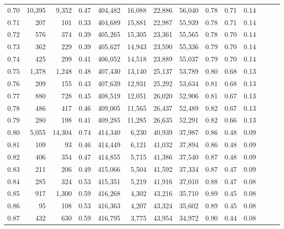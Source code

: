 \begin{tabular}{rrrrrrrrrrrrrr}
0.70 &  10,395 &   9,352 &  0.47 &  404,482 &   16,088 &  22,886 &  56,040 &  0.78 &  0.71 &      0.14 \\
0.71 &     207 &     101 &  0.33 &  404,689 &   15,881 &  22,987 &  55,939 &  0.78 &  0.71 &      0.14 \\
0.72 &     576 &     374 &  0.39 &  405,265 &   15,305 &  23,361 &  55,565 &  0.78 &  0.70 &      0.14 \\
0.73 &     362 &     229 &  0.39 &  405,627 &   14,943 &  23,590 &  55,336 &  0.79 &  0.70 &      0.14 \\
0.74 &     425 &     299 &  0.41 &  406,052 &   14,518 &  23,889 &  55,037 &  0.79 &  0.70 &      0.14 \\
0.75 &   1,378 &   1,248 &  0.48 &  407,430 &   13,140 &  25,137 &  53,789 &  0.80 &  0.68 &      0.13 \\
0.76 &     209 &     155 &  0.43 &  407,639 &   12,931 &  25,292 &  53,634 &  0.81 &  0.68 &      0.13 \\
0.77 &     880 &     728 &  0.45 &  408,519 &   12,051 &  26,020 &  52,906 &  0.81 &  0.67 &      0.13 \\
0.78 &     486 &     417 &  0.46 &  409,005 &   11,565 &  26,437 &  52,489 &  0.82 &  0.67 &      0.13 \\
0.79 &     280 &     198 &  0.41 &  409,285 &   11,285 &  26,635 &  52,291 &  0.82 &  0.66 &      0.13 \\
0.80 &   5,055 &  14,304 &  0.74 &  414,340 &    6,230 &  40,939 &  37,987 &  0.86 &  0.48 &      0.09 \\
0.81 &     109 &      93 &  0.46 &  414,449 &    6,121 &  41,032 &  37,894 &  0.86 &  0.48 &      0.09 \\
0.82 &     406 &     354 &  0.47 &  414,855 &    5,715 &  41,386 &  37,540 &  0.87 &  0.48 &      0.09 \\
0.83 &     211 &     206 &  0.49 &  415,066 &    5,504 &  41,592 &  37,334 &  0.87 &  0.47 &      0.09 \\
0.84 &     285 &     324 &  0.53 &  415,351 &    5,219 &  41,916 &  37,010 &  0.88 &  0.47 &      0.08 \\
0.85 &     917 &   1,300 &  0.59 &  416,268 &    4,302 &  43,216 &  35,710 &  0.89 &  0.45 &      0.08 \\
0.86 &      95 &     108 &  0.53 &  416,363 &    4,207 &  43,324 &  35,602 &  0.89 &  0.45 &      0.08 \\
0.87 &     432 &     630 &  0.59 &  416,795 &    3,775 &  43,954 &  34,972 &  0.90 &  0.44 &      0.08 \\

\end{tabular}
